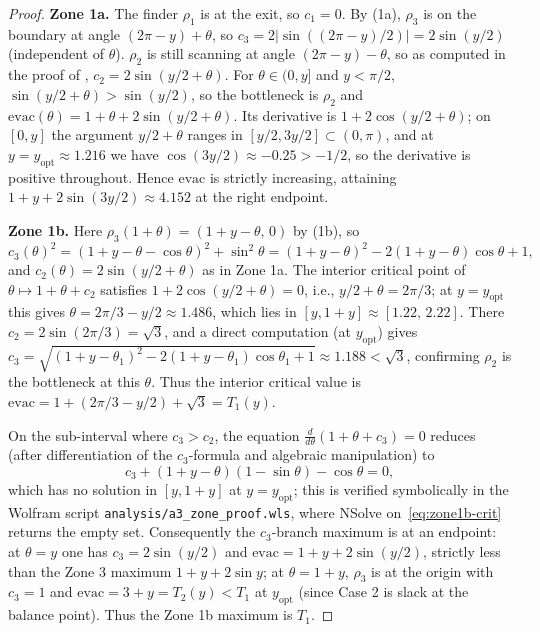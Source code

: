 \documentclass[11pt]{article}
\theoremstyle{plain}
\theoremstyle{definition}
\theoremstyle{remark}
\begin{document}
\begin{proof}
\textbf{Zone 1a.} The finder $\rho_1$ is at the exit, so $c_1 = 0$. By
(1a), $\rho_3$ is on the boundary at angle $(2\pi - y) +
\theta$, so $c_3 = 2\lvert\sin((2\pi - y)/2)\rvert = 2\sin(y/2)$
(independent of $\theta$). $\rho_2$ is still scanning at angle $(2\pi -
y) - \theta$, so as computed in the proof of ,
$c_2 = 2\sin(y/2 + \theta)$. For $\theta \in (0, y]$ and $y < \pi/2$,
$\sin(y/2 + \theta) > \sin(y/2)$, so the bottleneck is $\rho_2$ and
$\mathrm{evac}(\theta) = 1 + \theta + 2\sin(y/2 + \theta)$. Its derivative
is $1 + 2\cos(y/2 + \theta)$; on $[0, y]$ the argument $y/2 + \theta$
ranges in $[y/2, 3y/2] \subset (0, \pi)$, and at $y = y_{\mathrm{opt}}
\approx 1.216$ we have $\cos(3y/2) \approx -0.25 > -1/2$, so the
derivative is positive throughout. Hence $\mathrm{evac}$ is strictly
increasing, attaining $1 + y + 2\sin(3y/2) \approx 4.152$ at the
right endpoint.

\textbf{Zone 1b.} Here $\rho_3(1+\theta) = (1 + y - \theta,\, 0)$ by
(1b), so
\[
c_3(\theta)^2 = (1 + y - \theta - \cos\theta)^2 + \sin^2\theta
= (1+y-\theta)^2 - 2(1+y-\theta)\cos\theta + 1,
\]
and $c_2(\theta) = 2\sin(y/2 + \theta)$ as in Zone 1a. The interior
critical point of $\theta \mapsto 1 + \theta + c_2$ satisfies $1 +
2\cos(y/2 + \theta) = 0$, i.e., $y/2 + \theta = 2\pi/3$; at $y =
y_{\mathrm{opt}}$ this gives $\theta = 2\pi/3 - y/2 \approx 1.486$,
which lies in $[y, 1+y] \approx [1.22,\, 2.22]$. There $c_2 =
2\sin(2\pi/3) = \sqrt 3$, and a direct computation (at
$y_{\mathrm{opt}}$) gives $c_3 = \sqrt{(1 + y - \theta_1)^2 - 2(1 + y -
\theta_1)\cos\theta_1 + 1} \approx 1.188 < \sqrt 3$, confirming
$\rho_2$ is the bottleneck at this $\theta$. Thus the interior critical
value is $\mathrm{evac} = 1 + (2\pi/3 - y/2) + \sqrt 3 = T_1(y)$.

On the sub-interval where $c_3 > c_2$, the equation $\frac{d}{d\theta}(1
+ \theta + c_3) = 0$ reduces (after differentiation of the $c_3$-formula
and algebraic manipulation) to
\begin{equation}
\label{eq:zone1b-crit}
c_3 + (1 + y - \theta)(1 - \sin\theta) - \cos\theta = 0,
\end{equation}
which has no solution in $[y, 1+y]$ at $y = y_{\mathrm{opt}}$; this is
verified symbolically in the Wolfram script
\texttt{analysis/a3\_zone\_proof.wls}, where
\textsf{NSolve} on~\eqref{eq:zone1b-crit} returns the empty set.
Consequently the $c_3$-branch maximum is at an endpoint: at $\theta = y$
one has $c_3 = 2\sin(y/2)$ and $\mathrm{evac} = 1 + y + 2\sin(y/2)$,
strictly less than the Zone 3 maximum $1 + y + 2\sin y$; at $\theta
= 1 + y$, $\rho_3$ is at the origin with $c_3 = 1$ and $\mathrm{evac} =
3 + y = T_2(y) < T_1$ at $y_{\mathrm{opt}}$ (since Case 2 is slack at
the balance point). Thus the Zone 1b maximum is $T_1$.


\end{proof}
\end{document}
